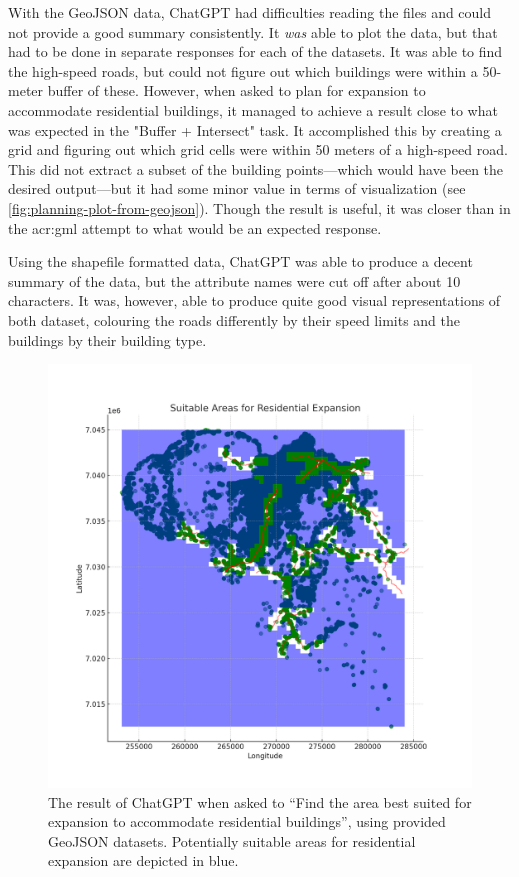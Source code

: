 With the GeoJSON data, ChatGPT had difficulties reading the files and could not provide a good summary consistently. It \textit{was} able to plot the data, but that had to be done in separate responses for each of the datasets. It was able to find the high-speed roads, but could not figure out which buildings were within a 50-meter buffer of these. However, when asked to plan for expansion to accommodate residential buildings, it managed to achieve a result close to what was expected in the "Buffer + Intersect" task. It accomplished this by creating a grid and figuring out which grid cells were within 50 meters of a high-speed road. This did not extract a subset of the building points---which would have been the desired output---but it had some minor value in terms of visualization (see \autoref{fig:planning-plot-from-geojson}). Though the result is useful, it was closer than in the \acrshort{acr:gml} attempt to what would be an expected response.

Using the shapefile formatted data, ChatGPT was able to produce a decent summary of the data, but the attribute names were cut off after about 10 characters. It was, however, able to produce quite good visual representations of both dataset, colouring the roads differently by their speed limits and the buildings by their building type.

\begin{figure}
    \centering
    \includegraphics[width=\textwidth]{../figs/residential_expansion_areas_map.png}
    \caption{The result of ChatGPT when asked to \enquote{Find the area best suited for expansion to accommodate residential buildings}, using provided GeoJSON datasets. Potentially suitable areas for residential expansion  are depicted in blue.}
    \label{fig:planning-plot-from-geojson}
\end{figure}

